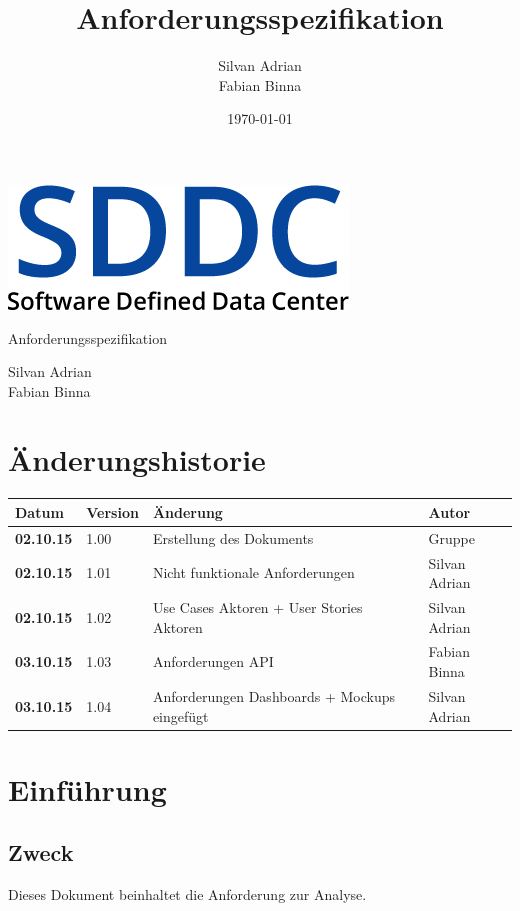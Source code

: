 \documentclass[11pt]{scrartcl}
\title{Anforderungsspezifikation}
\author{Silvan Adrian \\ Fabian Binna}
\date{\today{}}
\begin{document}
\def\arraystretch{1.5}
\begin{titlepage}
\begin{center}
\vspace{10em}
\includegraphics[scale=2]{SDDC}
\vspace{10em}
\end{center}
\begin{center}
\huge {Anforderungsspezifikation}
\end{center}
\begin{center}
\vspace{10em}
\LARGE {Silvan Adrian} \\
\LARGE {Fabian Binna}
\end{center}

\end{titlepage}

\newpage
\section{Änderungshistorie}
\begin{tabularx}{\linewidth}{l l X l}
\textbf{Datum} & \textbf{Version} & \textbf{Änderung}  & \textbf{Autor} \\
\hline
\textbf{02.10.15} & 1.00 & Erstellung des Dokuments & Gruppe \\
\textbf{02.10.15} & 1.01 & Nicht funktionale Anforderungen & Silvan Adrian\\
\textbf{02.10.15} & 1.02 & Use Cases Aktoren + User Stories Aktoren & Silvan 
Adrian\\
\textbf{03.10.15} & 1.03 & Anforderungen API & Fabian Binna\\
\textbf{03.10.15} & 1.04 & Anforderungen Dashboards + Mockups eingefügt & Silvan 
Adrian\\

\end{tabularx}

\newpage
\tableofcontents
\newpage

\section{Einführung}
\subsection{Zweck}
Dieses Dokument beinhaltet die Anforderung zur Analyse.
\end{document}
